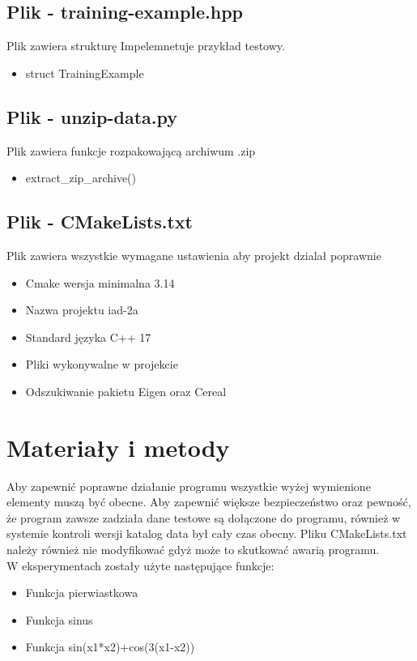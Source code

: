 \documentclass{classrep}
\begin{document}
{        \subsection{Plik - training-example.hpp}
        {
            Plik zawiera strukturę
            Impelemnetuje przykład testowy.
            \begin{itemize}
                \item struct TrainingExample
            \end{itemize}
        }

        \subsection{Plik - unzip-data.py}
        {
            Plik zawiera funkcje rozpakowającą archiwum .zip
            \begin{itemize}
                \item extract\_zip\_archive()
            \end{itemize}
        }

        \subsection{Plik - CMakeLists.txt}
        {
            Plik zawiera wszystkie wymagane ustawienia aby projekt dzialał poprawnie
            \begin{itemize}
                \item Cmake wersja minimalna 3.14
                \item Nazwa projektu iad-2a
                \item Standard języka C++ 17
                \item Pliki wykonywalne w projekcie
                \item Odszukiwanie pakietu Eigen oraz Cereal
            \end{itemize}
        }
    }
    \section{Materiały i metody}
    {
        Aby zapewnić poprawne działanie programu wszystkie wyżej wymienione elementy muszą być obecne. Aby zapewnić większe
        bezpieczeństwo oraz pewność, że program zawsze zadziała dane testowe są dołączone do programu, również w systemie
        kontroli wersji katalog data był cały czas obecny. Pliku CMakeLists.txt należy również nie modyfikować gdyż może
        to skutkować awarią programu.\\

        W eksperymentach zostały użyte następujące funkcje:
        \begin{itemize}
            \item Funkcja pierwiastkowa
            \item Funkcja sinus
            \item Funkcja sin(x1*x2)+cos(3(x1-x2))
        \end{itemize}
    }
\end{document}
